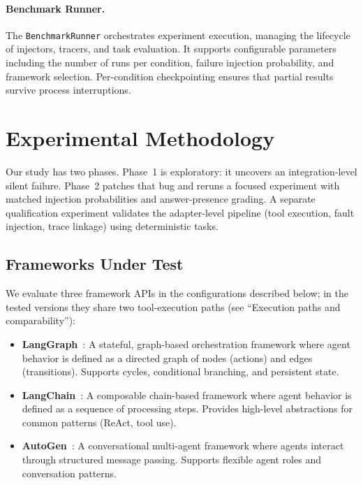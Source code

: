 \documentclass[make,article,submit,moreauthors,pdftex]{mdpi}
\newcommand{\Wrev}[1]{\texorpdfstring{{\color{RevisionOrange}#1}}{#1}}
\begin{document}
\paragraph{Benchmark Runner.}
The \texttt{BenchmarkRunner} orchestrates experiment execution, managing the lifecycle of injectors, tracers, and task evaluation. It supports configurable parameters including the number of runs per condition, failure injection probability, and framework selection. Per-condition checkpointing ensures that partial results survive process interruptions.


\section{Experimental Methodology}\label{sec:experiments}

Our study has two phases. Phase~1 is exploratory: it uncovers an integration-level silent failure. Phase~2 patches that bug and reruns a focused experiment with matched injection probabilities and answer-presence grading. A separate qualification experiment validates the adapter-level pipeline (tool execution, fault injection, trace linkage) using deterministic tasks.

\subsection{Frameworks Under Test}

\Wrev{We evaluate three framework APIs in the configurations described below; in the tested versions they share two tool-execution paths (see ``Execution paths and comparability''):}

\begin{itemize}
  \item \textbf{LangGraph}~\cite{langgraph2024}: A stateful, graph-based orchestration framework where agent behavior is defined as a directed graph of nodes (actions) and edges (transitions). Supports cycles, conditional branching, and persistent state.

  \item \textbf{LangChain}~\cite{langchain2023}: A composable chain-based framework where agent behavior is defined as a sequence of processing steps. Provides high-level abstractions for common patterns (ReAct, tool use).

  \item \textbf{AutoGen}~\cite{wu2023autogen}: A conversational multi-agent framework where agents interact through structured message passing. Supports flexible agent roles and conversation patterns.
\end{itemize}
\end{document}

